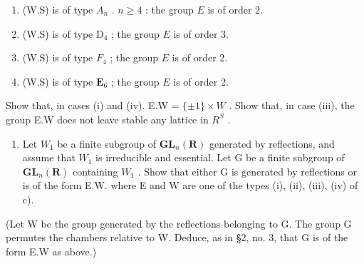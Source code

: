 \begin{enumerate}
\def\labelenumi{(\roman{enumi})}
\item
  (W.S) is of type \(A_{n}\) . \(n \geqslant 4\) : the group \(E\) is of order 2.
\item
  (W.S) is of type \(\mathrm{D}_4\) ; the group \(E\) is of order 3.
\item
  (W.S) is of type \(F_4\) ; the group \(E\) is of order 2.
\item
  (W.S) is of type \(\mathbf{E}_6\) ; the group \(E\) is of order 2.
\end{enumerate}

Show that, in cases (i) and (iv). E.W = \(\{\pm1\} \times W\) . Show that, in case (iii), the group E.W does not leave stable any lattice in \(R^{S}\) .

\begin{enumerate}
\def\labelenumi{\alph{enumi})}
\setcounter{enumi}{3}
\tightlist
\item
  Let \(W_{1}\) be a finite subgroup of \(\mathbf{GL}_{n}(\mathbf{R})\) generated by reflections, and assume that \(W_{1}\) is irreducible and essential. Let G be a finite subgroup of \(\mathbf{GL}_{n}(\mathbf{R})\) containing \(W_{1}\) . Show that either G is generated by reflections or is of the form E.W. where E and W are one of the types (i), (ii), (iii), (iv) of c).
\end{enumerate}

(Let W be the group generated by the reflections belonging to G. The group G permutes the chambers relative to W. Deduce, as in §2, no. 3, that G is of the form E.W as above.)

